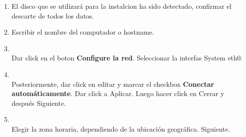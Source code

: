 \documentclass[11pt]{article}
\begin{document}
\begin{enumerate}
			\item El disco que se utilizará para la instalcion ha sido detectado, confirmar el descarte de todos los datos.
			\item Escribir el nombre del computador o hostname.
			\item 				
				\begin{minipage}[t]{\linewidth}
			          \raggedright
			          \medskip
			          \\Dar click en el boton \textbf{Configure la red}. Seleccionar la interfas System eth0.
			    \end{minipage}	

			\item
				\begin{minipage}[t]{\linewidth}
			          \raggedright
			          \medskip
			          \\Posteriormente, dar click en editar y marcar el checkbox \textbf{Conectar automáticamente}. Dar click a Aplicar. Luego hacer click en Cerrar y después Siguiente.
			    \end{minipage}	

			\item 
				\begin{minipage}[t]{\linewidth}
			          \raggedright
			          \medskip
			          \\Elegir la zona horaria, dependiendo de la ubicación geográfica. Siguiente. 
			    \end{minipage}	
			

\end{enumerate}
\end{document}
